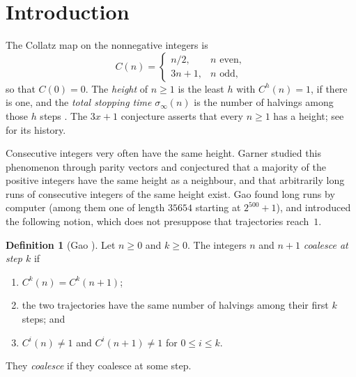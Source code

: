 \documentclass[11pt]{amsart}
\theoremstyle{definition}
\newtheorem{definition}[theorem]{Definition}
\theoremstyle{remark}
\begin{document}
\section{Introduction}

The Collatz map on the nonnegative integers is
\[
C(n)=\begin{cases} n/2, & n \text{ even},\\ 3n+1, & n \text{ odd},\end{cases}
\]
so that $C(0)=0$. The \emph{height} of $n\ge 1$ is the least $h$ with $C^{h}(n)=1$, if there is one, and the \emph{total stopping time} $\sigma_\infty(n)$ is the number of halvings among those $h$ steps \cite{Gao93}. The $3x+1$ conjecture asserts that every $n\ge1$ has a height; see \cite{Lag85,Lag10} for its history.

Consecutive integers very often have the same height. Garner \cite{Gar85} studied this phenomenon through parity vectors and conjectured that a majority of the positive integers have the same height as a neighbour, and that arbitrarily long runs of consecutive integers of the same height exist. Gao \cite{Gao93} found long runs by computer (among them one of length $35654$ starting at $2^{500}+1$), and introduced the following notion, which does not presuppose that trajectories reach~$1$.

\begin{definition}[Gao {\cite[p.~264]{Gao93}}]\label{def:coalesce}
Let $n\ge 0$ and $k\ge0$. The integers $n$ and $n+1$ \emph{coalesce at step $k$} if
\begin{enumerate}
\item $C^{k}(n)=C^{k}(n+1)$;
\item the two trajectories have the same number of halvings among their first $k$ steps; and
\item $C^{i}(n)\ne1$ and $C^{i}(n+1)\ne1$ for $0\le i\le k$.
\end{enumerate}
They \emph{coalesce} if they coalesce at some step.
\end{definition}
\end{document}
